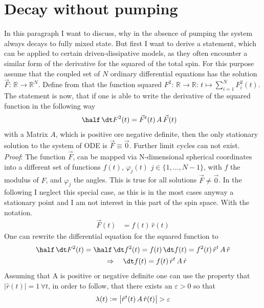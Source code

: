     \section{Decay without pumping}
    \label{appendix:msq_calc}
    In this paragraph I want to discuss, why in the absence of pumping the system always decays to fully mixed state. But first I want to derive a statement, which can be applied to certain driven-dissipative models, as they often encounter a similar form of the derivative  for the squared of the total spin. For this purpose assume that the coupled set of $N$ ordinary differential equations has the solution $\vec{F}:\,\mathbb{R}\rightarrow\mathbb{R}^N$. Define from that the function squared $F^2:\,\mathbb{R}\rightarrow\mathbb{R}:\,t\mapsto\sum_{i=1}^NF_i^2(t)$. The statement is now, that if one is able to write the derivative of the squared function in the following way
    \begin{align*}
        \half\,\dt F^2(t)&=\vec{F}^t(t)\,A\,\vec{F}(t)
    \end{align*}
    with a Matrix $A$, which is positive ore negative definite, then the only stationary solution to the system of ODE is $\vec{F}\equiv\vec{0}$. Further limit cycles can not exist. \\
    \textit{Proof}: The function $\vec{F}$, can be mapped via N-dimensional spherical coordinates into a different set of functions $f(t)$, $\varphi_j(t)$ $j\in\{1,\dots,N-1\}$, with $f$ the modulus of $F$, and $\varphi_j$ the angles. This is true for all solutions $\vec{F}\neq\vec{0}$. In the following I neglect this special case, as this is in the most cases anyway a stationary point and I am not interest in this part of the spin space. With the notation.
    \begin{align*}
        \vec{F}(t)&=f(t)\,\hat{r}(t)
    \end{align*}
    One can rewrite the differential equation for the squared function to
    \begin{align*}
        \half\,\dt F^2(t)=\half\,\dt f^2(t)=f(t)\,\dt f(t)&=f^2(t)\,\hat{r}^t\,A\,\hat{r}\\
        \Rightarrow\quad\dt f(t) = f(t)\,\hat{r}^t\,A\,\hat{r}
    \end{align*}
    Assuming that A is positive or negative definite one can use the property that $|\hat{r}(t)|=1\,\forall t$, in order to follow, that there exists an $\varepsilon>0$ so that
    \begin{align*}
        \lambda(t)\vcentcolon=\left| \hat{r}^t(t)\,A\,\hat{r}(t) \right| > \varepsilon
    \end{align*}
